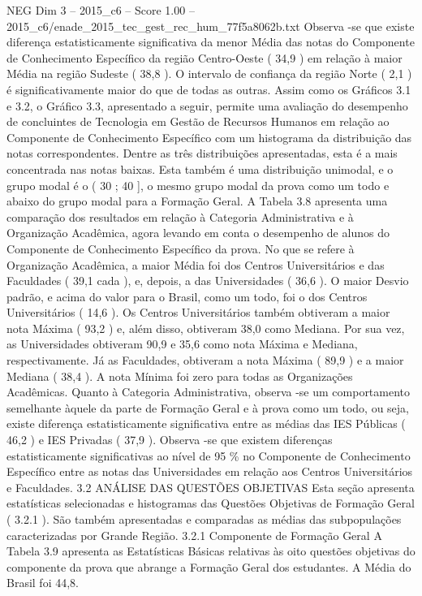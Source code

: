 \begin{textsample}{NEG Dim 3 – 2015\_c6 – Score 1.00 – 2015\_c6/enade\_2015\_tec\_gest\_rec\_hum\_77f5a8062b.txt}
Observa -se que existe diferença estatisticamente significativa da menor Média das notas do Componente de Conhecimento Específico da região Centro-Oeste ( 34,9 ) em relação à maior Média na região Sudeste ( 38,8 ).
O intervalo de confiança da região Norte ( 2,1 ) é significativamente maior do que de todas as outras.
Assim como os Gráficos 3.1 e 3.2, o Gráfico 3.3, apresentado a seguir, permite uma avaliação do desempenho de concluintes de Tecnologia em Gestão de Recursos Humanos em relação ao Componente de Conhecimento Específico com um histograma da distribuição das notas correspondentes.
Dentre as três distribuições apresentadas, esta é a mais concentrada nas notas baixas.
Esta também é uma distribuição unimodal, e o grupo modal é o ( 30 ; 40 ], o mesmo grupo modal da prova como um todo e abaixo do grupo modal para a Formação Geral.
A Tabela 3.8 apresenta uma comparação dos resultados em relação à Categoria Administrativa e à Organização Acadêmica, agora levando em conta o desempenho de alunos do Componente de Conhecimento Específico da prova.
No que se refere à Organização Acadêmica, a maior Média foi dos Centros Universitários e das Faculdades ( 39,1 cada ), e, depois, a das Universidades ( 36,6 ).
O maior Desvio padrão, e acima do valor para o Brasil, como um todo, foi o dos Centros Universitários ( 14,6 ).
Os Centros Universitários também obtiveram a maior nota Máxima ( 93,2 ) e, além disso, obtiveram 38,0 como Mediana.
Por sua vez, as Universidades obtiveram 90,9 e 35,6 como nota Máxima e Mediana, respectivamente.
Já as Faculdades, obtiveram a nota Máxima ( 89,9 ) e a maior Mediana ( 38,4 ).
A nota Mínima foi zero para todas as Organizações Acadêmicas.
Quanto à Categoria Administrativa, observa -se um comportamento semelhante àquele da parte de Formação Geral e à prova como um todo, ou seja, existe diferença estatisticamente significativa entre as médias das IES Públicas ( 46,2 ) e IES Privadas ( 37,9 ).
Observa -se que existem diferenças estatisticamente significativas ao nível de 95 \% no Componente de Conhecimento Específico entre as notas das Universidades em relação aos Centros Universitários e Faculdades. 3.2 ANÁLISE DAS QUESTÕES OBJETIVAS Esta seção apresenta estatísticas selecionadas e histogramas das Questões Objetivas de Formação Geral ( 3.2.1 ).
São também apresentadas e comparadas as médias das subpopulações caracterizadas por Grande Região. 3.2.1 Componente de Formação Geral A Tabela 3.9 apresenta as Estatísticas Básicas relativas às oito questões objetivas do componente da prova que abrange a Formação Geral dos estudantes.
A Média do Brasil foi 44,8.

\end{textsample}
